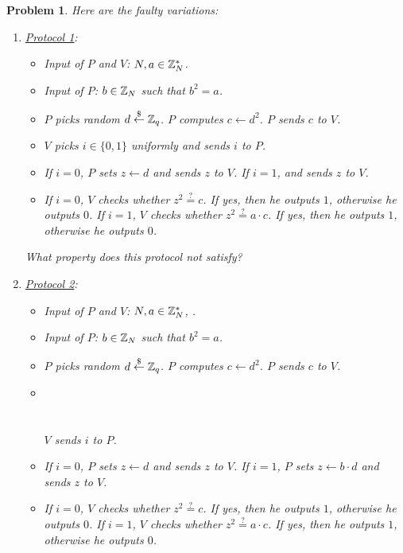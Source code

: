 \documentclass{../homework}
\newtheorem{problem}{Problem}
\newcommand{\rgets}{\stackrel{\mathdollar}\leftarrow}
\newcommand{\iseq}{\stackrel{?}=}
\begin{document}
\begin{problem}
    Here are the faulty variations:
    \begin{enumerate}
        \item \underline{Protocol 1}:
        \begin{itemize}
            \item Input of $P$ and $V$: $N,a\in \mathbb Z_N^{*}$.
            \item Input of $P$: $b\in \mathbb Z_N$ such that $b^2=a$.
            \item  $P$ picks random $d\rgets \Z_q$. $P$ computes $c\gets d^2$.
            $P$ sends $c$ to $V$.
            \item $V$ picks $i\in\{0,1\}$ uniformly and sends $i$ to $P$.
            \item If $i=0$, $P$ sets $z\gets d$ and sends $z$ to $V$. If $i=1$,
             and sends $z$ to $V$.
            \item If $i=0$, $V$ checks whether $z^2\iseq c$. If yes, then he
            outputs $1$, otherwise he outputs $0$. If $i=1$, $V$ checks whether
            $z^2\iseq a\cdot c$. If yes, then he outputs $1$, otherwise he
            outputs $0$.
        \end{itemize}
        
        What property does this protocol not satisfy?
        
        \item \underline{Protocol 2}:
        \begin{itemize}
            \item Input of $P$ and $V$: $N,a\in \mathbb Z_N^{*}$, .
            \item Input of $P$: $b\in \mathbb Z_N$ such that $b^2=a$.
            \item $P$ picks random $d\rgets \Z_q$. $P$ computes $c\gets d^2$.
            $P$ sends $c$ to $V$.
            \item {}\\
            \\
            \\
            $V$ sends $i$ to $P$.
            \item If $i=0$, $P$ sets $z\gets d$ and sends $z$ to $V$. If $i=1$,
            $P$ sets $z\gets b\cdot d$ and sends $z$ to $V$.
            \item  If $i=0$, $V$ checks whether $z^2\iseq c$. If yes, then he
            outputs $1$, otherwise he outputs $0$. If $i=1$, $V$ checks whether
            $z^2\iseq a\cdot c$. If yes, then he outputs $1$, otherwise he
            outputs $0$.
        \end{itemize}
        

\end{enumerate}
\end{problem}
\end{document}
